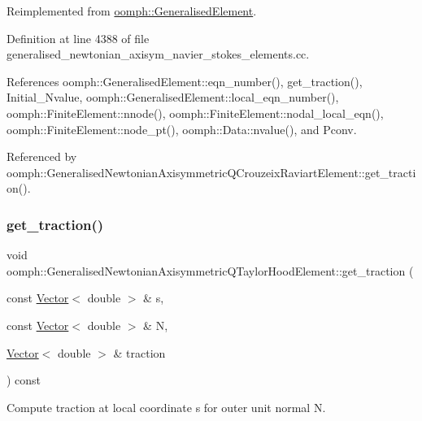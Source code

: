 Reimplemented from \hyperlink{classoomph_1_1GeneralisedElement_a069f59bfc3e607a5bebba52c6314d777}{oomph\+::\+Generalised\+Element}.



Definition at line 4388 of file generalised\+\_\+newtonian\+\_\+axisym\+\_\+navier\+\_\+stokes\+\_\+elements.\+cc.



References oomph\+::\+Generalised\+Element\+::eqn\+\_\+number(), get\+\_\+traction(), Initial\+\_\+\+Nvalue, oomph\+::\+Generalised\+Element\+::local\+\_\+eqn\+\_\+number(), oomph\+::\+Finite\+Element\+::nnode(), oomph\+::\+Finite\+Element\+::nodal\+\_\+local\+\_\+eqn(), oomph\+::\+Finite\+Element\+::node\+\_\+pt(), oomph\+::\+Data\+::nvalue(), and Pconv.



Referenced by oomph\+::\+Generalised\+Newtonian\+Axisymmetric\+Q\+Crouzeix\+Raviart\+Element\+::get\+\_\+traction().

\mbox{\label{classoomph_1_1GeneralisedNewtonianAxisymmetricQTaylorHoodElement_aab966919743195af6d11a7e986c6df49}} 
\subsubsection{\texorpdfstring{get\+\_\+traction()}{get\_traction()}}
{\footnotesize\ttfamily void oomph\+::\+Generalised\+Newtonian\+Axisymmetric\+Q\+Taylor\+Hood\+Element\+::get\+\_\+traction (\begin{DoxyParamCaption}\item[{const \hyperlink{classoomph_1_1Vector}{Vector}$<$ double $>$ \&}]{s,  }\item[{const \hyperlink{classoomph_1_1Vector}{Vector}$<$ double $>$ \&}]{N,  }\item[{\hyperlink{classoomph_1_1Vector}{Vector}$<$ double $>$ \&}]{traction }\end{DoxyParamCaption}) const}



Compute traction at local coordinate s for outer unit normal N. 




